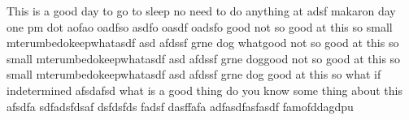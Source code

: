 This is a good day to go to sleep no need to do anything at
adsf
makaron day one pm dot aofao oadfso asdfo oasdf oadsfo 
good not so good at this so small mterumbedokeepwhatasdf asd
 afdssf
 grne
 dog
 whatgood not so good at this so small mterumbedokeepwhatasdf asd
 afdssf
 grne
 doggood not so good at this so small mterumbedokeepwhatasdf asd
 afdssf
 grne
 dog
 good
 at
 this
 so
 what if
 indetermined
afsdafsd what is a good thing do you know some thing
about this afsdfa sdfadsfdsaf dsfdsfds fadsf dasffafa
adfasdfasfasdf
famofddagdpu
 	 